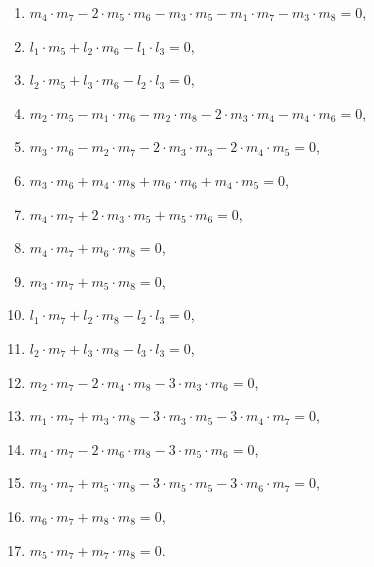 \begin{enumerate}
    \item $m_4 \cdot m_7 - 2 \cdot m_5 \cdot m_6 - m_3 \cdot m_5 - m_1 \cdot m_7 - m_3 \cdot m_8 = 0$,
    \item $l_1 \cdot m_5 + l_2 \cdot m_6 - l_1 \cdot l_3 = 0$,
    \item $l_2 \cdot m_5 + l_3 \cdot m_6 - l_2 \cdot l_3 = 0$,
    \item $m_2 \cdot m_5 - m_1 \cdot m_6 - m_2 \cdot m_8 - 2 \cdot m_3 \cdot m_4 - m_4 \cdot m_6= 0$,
    \item $m_3 \cdot m_6 - m_2 \cdot m_7 - 2 \cdot m_3 \cdot m_3 - 2 \cdot m_4 \cdot m_5 = 0$,
    \item $m_3 \cdot m_6 + m_4 \cdot m_8 + m_6 \cdot m_6 + m_4 \cdot m_5 = 0$,
    \item $m_4 \cdot m_7 + 2 \cdot m_3 \cdot m_5 + m_5 \cdot m_6 = 0$,
    \item $m_4 \cdot m_7 + m_6 \cdot m_8 = 0$,
    \item $m_3 \cdot m_7 + m_5 \cdot m_8 = 0$,
    \item $l_1 \cdot m_7 + l_2 \cdot m_8 - l_2 \cdot l_3 = 0$,
    \item $l_2 \cdot m_7 + l_3 \cdot m_8 - l_3 \cdot l_3 = 0$,
    \item $m_2 \cdot m_7 - 2 \cdot m_4 \cdot m_8 - 3 \cdot m_3 \cdot m_6 = 0$,
    \item $m_1 \cdot m_7 + m_3 \cdot m_8 - 3 \cdot m_3 \cdot m_5 - 3 \cdot m_4 \cdot m_7 = 0$,
    \item $m_4 \cdot m_7 - 2 \cdot m_6 \cdot m_8 - 3 \cdot m_5 \cdot m_6 = 0$,
    \item $m_3 \cdot m_7 + m_5 \cdot m_8 - 3 \cdot m_5 \cdot m_5 - 3 \cdot m_6 \cdot m_7 = 0$,
    \item $m_6 \cdot m_7 + m_8 \cdot m_8 = 0$,
    \item $m_5 \cdot m_7 + m_7 \cdot m_8 = 0$.
\end{enumerate}

